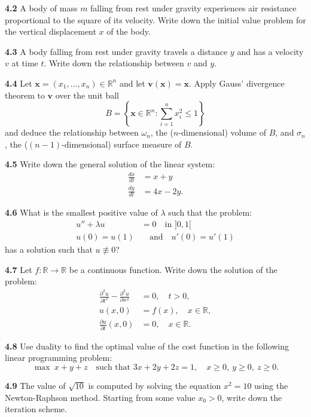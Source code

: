 \documentclass[11pt,a4paper]{article}
\newcommand{\R}{\mathbb{R}}
\newcommand{\qitem}[1]{\par\medskip\noindent\textbf{#1}\hspace{0.5em}}
\begin{document}
\qitem{4.2} A body of mass $m$ falling from rest under gravity experiences air resistance proportional to the square of its velocity. Write down the initial value problem for the vertical displacement $x$ of the body.

\qitem{4.3} A body falling from rest under gravity travels a distance $y$ and has a velocity $v$ at time $t$. Write down the relationship between $v$ and $y$.

\qitem{4.4} Let $\mathbf{x} = (x_1, \dots, x_n) \in \R^n$ and let $\mathbf{v}(\mathbf{x}) = \mathbf{x}$. Apply Gauss' divergence theorem to $\mathbf{v}$ over the unit ball
\[
  B = \left\{\mathbf{x} \in \R^n : \sum_{i=1}^{n} x_i^2 \le 1\right\}
\]
and deduce the relationship between $\omega_n$, the ($n$-dimensional) volume of $B$, and $\sigma_n$, the ($(n-1)$-dimensional) surface measure of $B$.

\qitem{4.5} Write down the general solution of the linear system:
\begin{align*}
  \frac{dx}{dt} &= x + y \\
  \frac{dy}{dt} &= 4x - 2y.
\end{align*}

\qitem{4.6} What is the smallest positive value of $\lambda$ such that the problem:
\begin{align*}
  u'' + \lambda u &= 0 \quad \text{in } ]0, 1[ \\
  u(0) = u(1) &\quad \text{and} \quad u'(0) = u'(1)
\end{align*}
has a solution such that $u \not\equiv 0$?

\qitem{4.7} Let $f : \R \to \R$ be a continuous function. Write down the solution of the problem:
\begin{align*}
  \frac{\partial^2 u}{\partial t^2} - \frac{\partial^2 u}{\partial x^2} &= 0, \quad t > 0, \\
  u(x, 0) &= f(x), \quad x \in \R, \\
  \frac{\partial u}{\partial t}(x, 0) &= 0, \quad x \in \R.
\end{align*}

\qitem{4.8} Use duality to find the optimal value of the cost function in the following linear programming problem:
\[
  \max\ x + y + z \quad \text{such that } 3x + 2y + 2z = 1,\quad x \ge 0,\ y \ge 0,\ z \ge 0.
\]

\qitem{4.9} The value of $\sqrt{10}$ is computed by solving the equation $x^2 = 10$ using the Newton-Raphson method. Starting from some value $x_0 > 0$, write down the iteration scheme.
\end{document}
